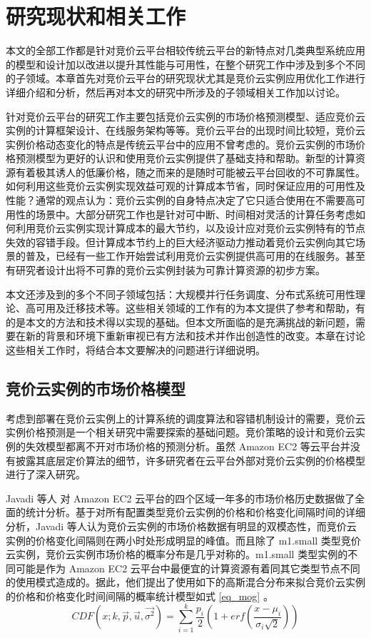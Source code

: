 \chapter{研究现状和相关工作}
\label{cha:background}

本文的全部工作都是针对竞价云平台相较传统云平台的新特点对几类典型系统应用的模型和设计加以改进以提升其性能与可用性，在整个研究工作中涉及到多个不同的子领域。本章首先对竞价云平台的研究现状尤其是竞价云实例应用优化工作进行详细介绍和分析，然后再对本文的研究中所涉及的子领域相关工作加以讨论。

针对竞价云平台的研究工作主要包括竞价云实例的市场价格预测模型、适应竞价云实例的计算框架设计、在线服务架构等等。竞价云平台的出现时间比较短，竞价云实例价格动态变化的特点是传统云平台中的应用不曾考虑的。竞价云实例的市场价格预测模型为更好的认识和使用竞价云实例提供了基础支持和帮助。新型的计算资源有着极其诱人的低廉价格，随之而来的是随时可能被云平台回收的不可靠属性。如何利用这些竞价云实例实现效益可观的计算成本节省，同时保证应用的可用性及性能？通常的观点认为：竞价云实例的自身特点决定了它只适合使用在不需要高可用性的场景中。大部分研究工作也是针对可中断、时间相对灵活的计算任务考虑如何利用竞价云实例实现计算成本的最大节约，以及设计应对竞价云实例特有的节点失效的容错手段。但计算成本节约上的巨大经济驱动力推动着竞价云实例向其它场景的普及，已经有一些工作开始尝试利用竞价云实例提供高可用的在线服务。甚至有研究者设计出将不可靠的竞价云实例封装为可靠计算资源的初步方案。

本文还涉及到的多个不同子领域包括：大规模并行任务调度、分布式系统可用性理论、高可用及迁移技术等。这些相关领域的工作有的为本文提供了参考和帮助，有的是本文的方法和技术得以实现的基础。但本文所面临的是充满挑战的新问题，需要在新的背景和环境下重新审视已有方法和技术并作出创造性的改变。本章在讨论这些相关工作时，将结合本文要解决的问题进行详细说明。

\section{竞价云实例的市场价格模型}
考虑到部署在竞价云实例上的计算系统的调度算法和容错机制设计的需要，竞价云实例价格预测是一个相关研究中需要探索的基础问题。竞价策略的设计和竞价云实例的失效模型都离不开对市场价格的预测分析。虽然 Amazon EC2 等云平台并没有披露其底层定价算法的细节，许多研究者在云平台外部对竞价云实例的价格模型进行了深入研究。

Javadi 等人 \cite{Javadi:2011:SMS:2120969.2121740} 对 Amazon EC2 云平台的四个区域一年多的市场价格历史数据做了全面的统计分析。基于对所有配置类型竞价云实例的价格和价格变化间隔时间的详细分析，Javadi 等人认为竞价云实例的市场价格数据有明显的双模态性，而竞价云实例的价格变化间隔则在两小时处形成明显的峰值。而且除了 m1.small 类型竞价云实例，竞价云实例市场价格的概率分布是几乎对称的。m1.small 类型实例的不同可能是作为 Amazon EC2 云平台中最便宜的计算资源有着同其它类型节点不同的使用模式造成的。据此，他们提出了使用如下的高斯混合分布来拟合竞价云实例的价格和价格变化时间间隔的概率统计模型如式 \eqref{eq_mog} 。
\begin{equation}\label{eq_mog} 
CDF(x; k, \vec p, \vec u, \vec{\sigma^2}) = \sum_{i=1}^{k}{\frac{p_i}{2}(1+erf(\frac{x-\mu_i}{\sigma_i\sqrt{2}}))}
\end{equation}

